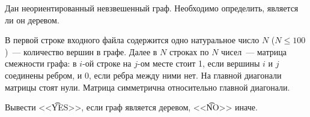 

Дан неориентированный невзвешенный граф. Необходимо
определить, является ли он деревом.

\InputFile
В первой строке входного файла содержится одно
натуральное число $N$ (${N \leqslant 100}$)~--- количество вершин в
графе. Далее в $N$ строках по $N$ чисел~--- матрица смежности
графа: в $i$-ой строке на $j$-ом месте стоит 1, если вершины
$i$ и $j$ соединены ребром, и 0, если ребра между ними
нет. На главной диагонали матрицы стоят нули. Матрица
симметрична относительно главной диагонали.

\OutputFile
Вывести <<\t{YES}>>, если граф является деревом, <<\t{NO}>> иначе.


